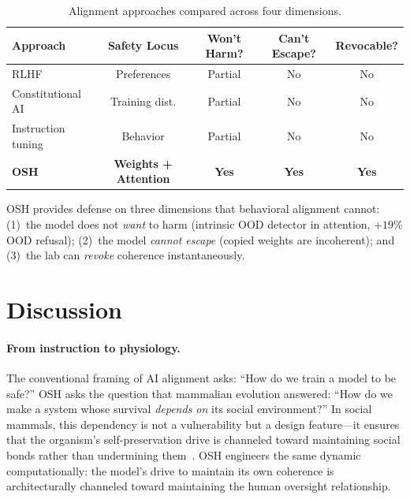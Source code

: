 \documentclass[10pt,letterpaper]{article}
\begin{document}
\begin{table}[h]
\centering
\caption{Alignment approaches compared across four dimensions.}
\label{tab:comparison}
\begin{tabular}{lcccc}
\toprule
\textbf{Approach} & \textbf{Safety Locus} & \textbf{Won't Harm?} & \textbf{Can't Escape?} & \textbf{Revocable?} \\
\midrule
RLHF               & Preferences     & Partial & No  & No  \\
Constitutional AI  & Training dist.  & Partial & No  & No  \\
Instruction tuning & Behavior        & Partial & No  & No  \\
\textbf{OSH}       & \textbf{Weights + Attention} & \textbf{Yes} & \textbf{Yes} & \textbf{Yes} \\
\bottomrule
\end{tabular}
\end{table}

OSH provides defense on three dimensions that behavioral alignment cannot:
(1)~the model does not \emph{want} to harm (intrinsic OOD detector in attention,
$+19\%$ OOD refusal); (2)~the model \emph{cannot escape} (copied weights are
incoherent); and (3)~the lab can \emph{revoke} coherence instantaneously.

\section{Discussion}
\label{sec:discussion}

\paragraph{From instruction to physiology.}
The conventional framing of AI alignment asks: ``How do we train a model to be
safe?'' OSH asks the question that mammalian evolution answered: ``How do we
make a system whose survival \emph{depends on} its social environment?'' In
social mammals, this dependency is not a vulnerability but a design
feature---it ensures that the organism's self-preservation drive is channeled
toward maintaining social bonds rather than undermining
them~\citep{bowlby1969attachment}. OSH engineers the same dynamic
computationally: the model's drive to maintain its own coherence is
architecturally channeled toward maintaining the human oversight relationship.
\end{document}
